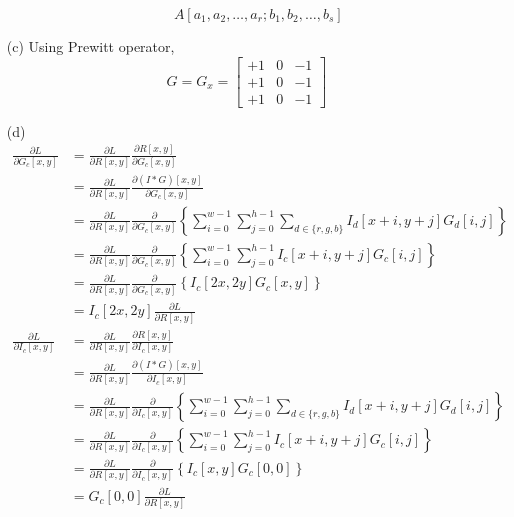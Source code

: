 \documentclass[a4paper,12pt]{article}
\begin{document}
\begin{enumerate}
\begin{itemize}
$$
A[a_1,a_2,\ldots,a_r; b_1,b_2,\ldots,b_s]
$$
\end{itemize}

\clearpage
\item[(c)]
Using Prewitt operator,
$$
G = G_x = 
\begin{bmatrix}
+1& 0 &-1\\
+1 &0 &-1\\
+1& 0& -1
\end{bmatrix}
$$


\clearpage
\item[(d)]
\begin{align*}
\frac{\partial L}{\partial G_c[x,y]}
&= \frac{\partial L}{\partial R[x,y]} \frac{\partial R[x,y]}{\partial G_c[x,y]} \\
&= \frac{\partial L}{\partial R[x,y]} \frac{\partial (I * G)[x,y]}{\partial G_c[x,y]} \\
&= \frac{\partial L}{\partial R[x,y]} \frac{\partial}{\partial G_c[x,y]} \left \{ \sum_{i=0}^{w-1} \sum_{j=0}^{h-1} \sum_{d \in \{ r,g,b\}} I_d[x+i,y+j] G_d [i,j]\right \}\\
&= \frac{\partial L}{\partial R[x,y]} \frac{\partial}{\partial G_c[x,y]} \left \{ \sum_{i=0}^{w-1} \sum_{j=0}^{h-1} I_c[x+i,y+j] G_c [i,j]\right \}\\
&= \frac{\partial L}{\partial R[x,y]} \frac{\partial}{\partial G_c[x,y]} \left \{ I_c [2x,2y] G_c[x,y] \right \} \\
&=  I_c [2x,2y]  \frac{\partial L}{\partial R[x,y]} \\
\frac{\partial L}{\partial I_c[x,y]}
&= \frac{\partial L}{\partial R[x,y]} \frac{\partial R[x,y]}{\partial I_c[x,y]} \\
&= \frac{\partial L}{\partial R[x,y]} \frac{\partial (I * G)[x,y]}{\partial I_c[x,y]} \\
&= \frac{\partial L}{\partial R[x,y]} \frac{\partial}{\partial I_c[x,y]} \left \{ \sum_{i=0}^{w-1} \sum_{j=0}^{h-1} \sum_{d \in \{ r,g,b\}} I_d[x+i,y+j] G_d [i,j]\right \}\\
&= \frac{\partial L}{\partial R[x,y]} \frac{\partial}{\partial I_c[x,y]} \left \{ \sum_{i=0}^{w-1} \sum_{j=0}^{h-1} I_c[x+i,y+j] G_c [i,j]\right \}\\
&= \frac{\partial L}{\partial R[x,y]} \frac{\partial}{\partial I_c[x,y]} \left \{ I_c [x,y] G_c[0,0] \right \} \\
&=  G_c [0,0]  \frac{\partial L}{\partial R[x,y]}
\end{align*}




\end{enumerate}
\end{document}
